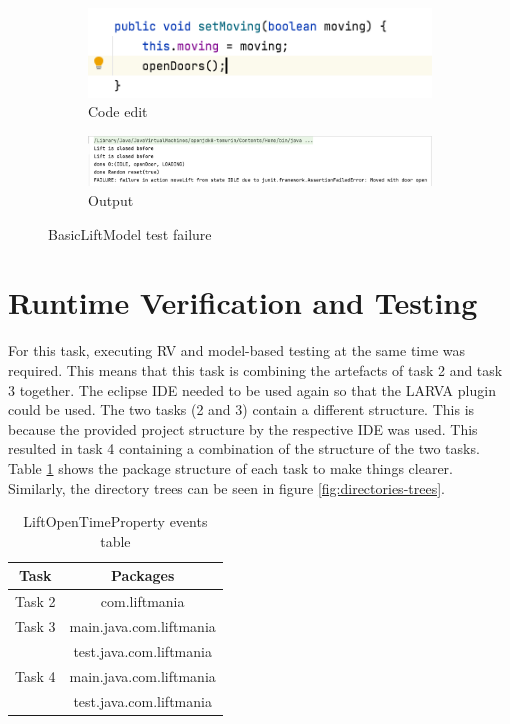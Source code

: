 \documentclass[a4paper, 12pt]{article}
\begin{document}
\begin{figure}[h]
\centering
\begin{subfigure}{.5\textwidth}
  \centering
  \includegraphics[width=\linewidth]{images/BasicLiftModel-fail-code}
  \caption{Code edit}
\end{subfigure}%
\begin{subfigure}{.5\textwidth}
  \centering
  \includegraphics[width=\linewidth]{images/BasicLiftModel-fail-output}
  \caption{Output}
\end{subfigure}
\caption{BasicLiftModel test failure}
\label{fig:BasicLiftModel-fail}
\end{figure}


\section{Runtime Verification and Testing}
For this task, executing RV and model-based testing at the same time was required. This means that this task is combining the artefacts of task 2 and task 3 together.  The eclipse IDE needed to be used again so that the LARVA plugin could be used. The two tasks (2 and 3) contain a different structure. This is because the provided project structure by the respective IDE was used. This resulted in task 4 containing a combination of the structure of the two tasks. Table \ref{tab:packages-structure} shows the package structure of each task to make things clearer. Similarly, the directory trees can be seen in figure \ref{fig:directories-trees}. \\

\begin{table}[h]
   \centering
   \begin{tabular}{@{}  |c|c| @{}} %
      \toprule
      Task   & Packages \\
      \midrule
      Task 2  &  com.liftmania\\
      Task 3 & main.java.com.liftmania  \\
      & test.java.com.liftmania\\
      Task 4  & main.java.com.liftmania\\
      & test.java.com.liftmania\\
      \bottomrule
   \end{tabular}
   \caption{LiftOpenTimeProperty events table}
   \label{tab:packages-structure}
\end{table}
\end{document}
